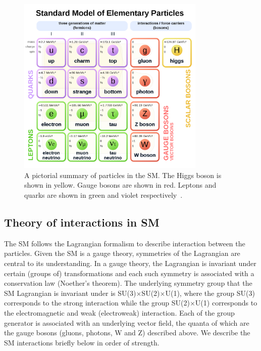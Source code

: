 \begin{figure}[hbtp]
 \begin{center}
   \includegraphics[width=0.8\textwidth]{plots_and_figures/chapter2/SM_particles.pdf}
   \caption{A pictorial summary of particles in the SM. The Higgs boson is shown in yellow. Gauge bosons are shown in red. Leptons and quarks are shown in green and violet respectively~\cite{sm_zoo}.}
   \label{fig:sm_zoo}
 \end{center}
\end{figure}


\subsection{Theory of interactions in SM}
The SM follows the Lagrangian formalism to describe interaction between the particles. Given the SM is a gauge theory, symmetries of the Lagrangian are central to its understanding. In a gauge theory, the Lagrangian is invariant under certain (groups of) transformations and each such symmetry is associated with a conservation law (Noether's theorem). The underlying symmetry group that the SM Lagrangian is invariant under is SU(3)$\times$SU(2)$\times$U(1), where the group SU(3) corresponds to the strong interaction while the group SU(2)$\times$U(1) corresponds to the electromagnetic and weak (electroweak) interaction. Each of the group generator is associated with an underlying vector field, the quanta of which are the gauge bosons (gluons, photons, W and Z) described above. We describe the SM interactions briefly below in order of strength.

